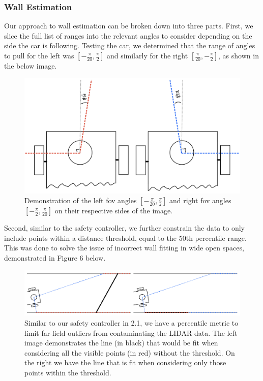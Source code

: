 \documentclass{article}
\begin{document}
\subsubsection{Wall Estimation}
Our approach to wall estimation can be broken down into three parts. First, we slice the full list of ranges into the relevant angles to consider depending on the side the car is following. Testing the car, we determined that the range of angles to pull for the left was $[-\frac{\pi}{20}, \frac{\pi}{2}]$ and similarly for the right  $[\frac{\pi}{20}, -\frac{\pi}{2}]$, as shown in the below image.\\

\begin{figure}[!h]
\begin{center}
\includegraphics[width=1.0\textwidth]{car_wall_ranges.png}
\caption{Demonstration of the left fov angles $[-\frac{\pi}{20},\frac{\pi}{2}]$ and right fov angles $[-\frac{\pi}{2},\frac{\pi}{20}]$ on their respective sides of the image.}
\end{center}
\end{figure}

Second, similar to the safety controller, we further constrain the data to only include points within a distance threshold, equal to the 50th percentile range. This was done to solve the issue of incorrect wall fitting in wide open spaces, demonstrated in Figure 6 below. \\

\begin{figure}[!h]
\begin{center}
\includegraphics[width=\textwidth]{wall_percentile.png}
\caption{Similar to our safety controller in 2.1, we have a percentile metric to limit far-field outliers from contaminating the LIDAR data. The left image demonstrates the line (in black) that would be fit when considering all the visible points (in red) without the threshold. On the right we have the line that is fit when considering only those points within the threshold.}
\end{center}
\end{figure}
\end{document}
